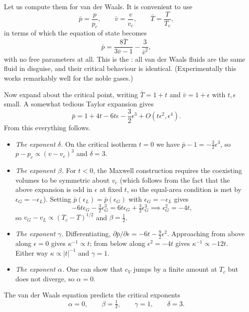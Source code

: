 \documentclass[a4paper]{scrartcl}
\begin{document}
Let us compute them for van der Waals. It is convenient to use 
$$
\bar p = \frac{p}{p_c}, \qquad \bar v = \frac{v}{v_c}, \qquad \bar T = \frac{T}{T_c},
$$
in terms of which the equation of state becomes
$$
\bar p = \frac{8\bar T}{3\bar v - 1} - \frac{3}{\bar v^2},
$$
with no free parameters at all. This is the : all van der Waals fluids are the same fluid in disguise, and their critical behaviour is identical. (Experimentally this works remarkably well for the noble gases.)

Now expand about the critical point, writing $\bar T = 1+t$ and $\bar v = 1 + \epsilon$ with $t, \epsilon$ small. A somewhat tedious Taylor expansion gives
$$
\bar p = 1 + 4t - 6t\epsilon - \frac 32 \epsilon^3 + O(t\epsilon^2, \epsilon^4).
$$
From this everything follows.

\begin{itemize}
	\item \emph{The exponent $\delta$.} On the critical isotherm $t = 0$ we have $\bar p - 1 = -\tfrac32 \epsilon^3$, so $p - p_c \propto (v-v_c)^3$ and $\delta = 3$.
	\item \emph{The exponent $\beta$.} For $t< 0$, the Maxwell construction requires the coexisting volumes to be symmetric about $v_c$ (which follows from the fact that the above expansion is odd in $\epsilon$ at fixed $t$, so the equal-area condition is met by $\epsilon_G = -\epsilon_L$). Setting $\bar p(\epsilon_L) = \bar p(\epsilon_G)$ with $\epsilon_G = -\epsilon_L$ gives
	$$
	-6t\epsilon_G - \tfrac 32\epsilon_G^3 = 6t\epsilon_G + \tfrac 32 \epsilon_G^3 \implies \epsilon_G^2 = -4t,
	$$
	so $v_G - v_L \propto (T_c - T)^{1/2}$ and $\beta = \tfrac 12$.
	\item \emph{The exponent $\gamma$.} Differentiating, $\partial\bar p/\partial \epsilon = -6t - \tfrac 92\epsilon^2$. Approaching from above along $\epsilon = 0$ gives $\kappa^{-1} \propto t$; from below along $\epsilon^2 = -4t$ gives $\kappa^{-1}\propto -12 t$. Either way $\kappa \propto |t|^{-1}$ and $\gamma = 1$.
	\item \emph{The exponent $\alpha$.} One can show that $c_V$ jumps by a finite amount at $T_c$ but does not diverge, so $\alpha = 0$.
\end{itemize}

\begin{proposition}
	The van der Waals equation predicts the critical exponents
	$$
	\alpha = 0, \qquad \beta = \tfrac 12, \qquad \gamma = 1, \qquad \delta = 3.
	$$
\end{proposition}
\end{document}

